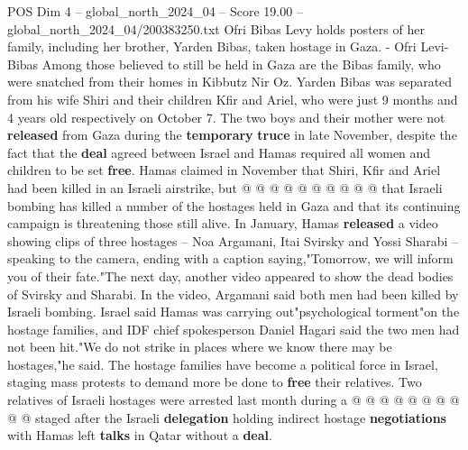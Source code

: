 \begin{textsample}{POS Dim 4 – global\_north\_2024\_04 – Score 19.00 – global\_north\_2024\_04/200383250.txt}
Ofri Bibas Levy holds posters of her family, including her brother, Yarden Bibas, taken hostage in Gaza. - Ofri Levi-Bibas Among those believed to still be held in Gaza are the Bibas family, who were snatched from their homes in Kibbutz Nir Oz.
Yarden Bibas was separated from his wife Shiri and their children Kfir and Ariel, who were just 9 months and 4 years old respectively on October 7.
The two boys and their mother were not \textbf{released} from Gaza during the \textbf{temporary} \textbf{truce} in late November, despite the fact that the \textbf{deal} agreed between Israel and Hamas required all women and children to be set \textbf{free}.
Hamas claimed in November that Shiri, Kfir and Ariel had been killed in an Israeli airstrike, but @ @ @ @ @ @ @ @ @ @ that Israeli bombing has killed a number of the hostages held in Gaza and that its continuing campaign is threatening those still alive.
In January, Hamas \textbf{released} a video showing clips of three hostages -- Noa Argamani, Itai Svirsky and Yossi Sharabi -- speaking to the camera, ending with a caption saying,"Tomorrow, we will inform you of their fate."The next day, another video appeared to show the dead bodies of Svirsky and Sharabi.
In the video, Argamani said both men had been killed by Israeli bombing.
Israel said Hamas was carrying out"psychological torment"on the hostage families, and IDF chief spokesperson Daniel Hagari said the two men had not been hit."We do not strike in places where we know there may be hostages,"he said.
The hostage families have become a political force in Israel, staging mass protests to demand more be done to \textbf{free} their relatives.
Two relatives of Israeli hostages were arrested last month during a @ @ @ @ @ @ @ @ @ @ staged after the Israeli \textbf{delegation} holding indirect hostage \textbf{negotiations} with Hamas left \textbf{talks} in Qatar without a \textbf{deal}.

\end{textsample}
